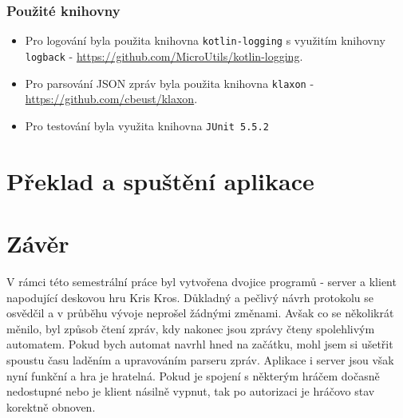 \documentclass[12pt, a4paper]{article}
\let\oldsection\section
\renewcommand\section{\clearpage\oldsection}
\begin{document}
			\subsubsection{Použité knihovny}
			\begin{itemize}
				\item Pro logování byla použita knihovna \texttt{kotlin-logging} s využitím knihovny \texttt{logback} - \href{https://github.com/MicroUtils/kotlin-logging}{https://github.com/MicroUtils/kotlin-logging}. 

	\item Pro parsování JSON zpráv byla použita knihovna \texttt{klaxon} -\\ \href{https://github.com/cbeust/klaxon}{https://github.com/cbeust/klaxon}. 
		\item Pro testování byla využita knihovna \texttt{JUnit 5.5.2}
			\end{itemize}
			
	\section{Překlad a spuštění aplikace}
    \section{Závěr}
    V rámci této semestrální práce byl vytvořena dvojice programů - server a klient napodující deskovou hru Kris Kros. Důkladný a pečlivý návrh protokolu se osvědčil a v průběhu vývoje neprošel žádnými změnami. Avšak co se několikrát měnilo, byl způsob čtení zpráv, kdy nakonec jsou zprávy čteny spolehlivým automatem. Pokud bych automat navrhl hned na začátku, mohl jsem si ušetřit spoustu času laděním a upravováním parseru zpráv. Aplikace i server jsou však nyní funkční a hra je hratelná. Pokud je spojení s některým hráčem dočasně nedostupné nebo je klient násilně vypnut, tak po autorizaci je hráčovo stav korektně obnoven.
    



	
	
\end{document}
